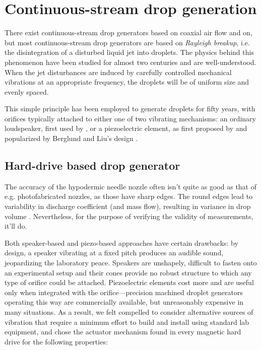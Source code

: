 \documentclass[11.5pt]{book}
\begin{document}
\section{Continuous-stream drop generation}
There exist continuous-stream drop generators based on coaxial air flow
\cite{Green89} and on,
but most continuous-stream drop generators are based on
\emph{Rayleigh breakup}, i.e. the disintegration of a disturbed liquid jet into
droplets. The physics behind this phenomenon have been studied for almost two
centuries \cite{Savart33, Rayleigh79} and are well-understood. When the jet
disturbances are induced by carefully controlled mechanical vibrations at an
appropriate frequency, the droplets will be of uniform size and evenly spaced.

This simple principle has been employed to generate droplets for fifty years,
with orifices typically attached to either one of two vibrating mechanisms: an
ordinary loudspeaker, first used by \citet{Donnelly66}, or
a piezoelectric element, as first proposed by \citet{Schneider64} and popularized by Berglund and Liu's
design \cite{Berglund73}.


\subsection{Hard-drive based drop generator}
The accuracy of the hypodermic needle nozzle often isn't quite as good as that of e.g.
photofabricated nozzles, as those have sharp edges. The round edges lead to
variability in discharge coefficient (and mass flow), resulting in variance in
drop volume \cite{Dressler90}. Nevertheless, for the purpose of verifying the validity of
measurements, it'll do.

Both speaker-based and piezo-based approaches have certain drawbacks: by design,
a speaker vibrating at a fixed pitch produces an audible sound, jeopardizing the
laboratory peace. Speakers are unshapely, difficult to fasten onto an
experimental setup and their cones provide no robust structure to which any type
of orifice could be attached. Piezoelectric elements cost more and are useful
only when integrated with the orifice---precision machined droplet generators
operating this way are commercially available, but unreasonably expensive in
many situations. As a result, we felt compelled to consider alternative sources
of vibration that require a minimum effort to build and install using standard
lab equipment, and chose the actuator mechanism found in every magnetic hard
drive for the following properties:
\end{document}
